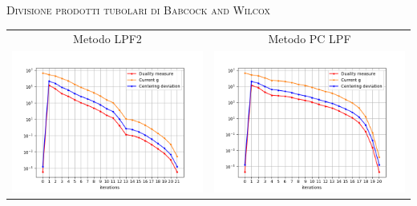 \begin{frame}{\textsc{\LARGE \textcolor{iris}{Divisione prodotti tubolari di Babcock and Wilcox}}}
	\centering
	\begin{tabular}{c@{}c}
		\small{Metodo LPF2} & \small{Metodo PC LPF} \\
		\includegraphics[scale = 0.33]{tub_LPF2}
		&\includegraphics[scale = 0.33]{tub_PCLPF}\\ 
	\end{tabular}
\end{frame}

